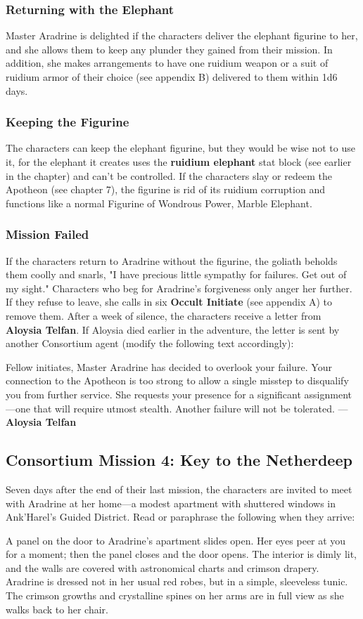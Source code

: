 \documentclass[10pt,a4,twoside,twocolumn,openany,nodeprecatedcode]{dndbook}
\begin{document}
\subsubsection{Returning with the Elephant}
Master Aradrine is delighted if the characters deliver the elephant figurine to her, and she allows them to keep any plunder they gained from their mission. In addition, she makes arrangements to have one ruidium weapon or a suit of ruidium armor of their choice (see appendix B) delivered to them within 1d6 days.
\subsubsection{Keeping the Figurine}
The characters can keep the elephant figurine, but they would be wise not to use it, for the elephant it creates uses the \textbf{ruidium elephant} stat block (see earlier in the chapter) and can't be controlled.
If the characters slay or redeem the Apotheon (see chapter 7), the figurine is rid of its ruidium corruption and functions like a normal Figurine of Wondrous Power, Marble Elephant.
\subsubsection{Mission Failed}
If the characters return to Aradrine without the figurine, the goliath beholds them coolly and snarls, "I have precious little sympathy for failures. Get out of my sight." Characters who beg for Aradrine's forgiveness only anger her further. If they refuse to leave, she calls in six \textbf{Occult Initiate} (see appendix A) to remove them.
After a week of silence, the characters receive a letter from \textbf{Aloysia Telfan}. If Aloysia died earlier in the adventure, the letter is sent by another Consortium agent (modify the following text accordingly):
\begin{DndReadAloud}{}
Fellow initiates,
Master Aradrine has decided to overlook your failure. Your connection to the Apotheon is too strong to allow a single misstep to disqualify you from further service. She requests your presence for a significant assignment—one that will require utmost stealth. Another failure will not be tolerated.
—\textbf{Aloysia Telfan}
\end{DndReadAloud}

\subsection{Consortium Mission 4: Key to the Netherdeep}
Seven days after the end of their last mission, the characters are invited to meet with Aradrine at her home—a modest apartment with shuttered windows in Ank'Harel's Guided District. Read or paraphrase the following when they arrive:
\begin{DndReadAloud}{}
A panel on the door to Aradrine's apartment slides open. Her eyes peer at you for a moment; then the panel closes and the door opens. The interior is dimly lit, and the walls are covered with astronomical charts and crimson drapery.
Aradrine is dressed not in her usual red robes, but in a simple, sleeveless tunic. The crimson growths and crystalline spines on her arms are in full view as she walks back to her chair.
\end{DndReadAloud}
\end{document}
